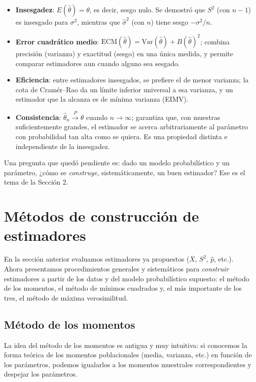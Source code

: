 \documentclass[11pt,a4paper]{article}
\theoremstyle{plain}
\theoremstyle{definition}
\theoremstyle{remark}
\begin{document}
\begin{itemize}[leftmargin=1.3cm]
\item \textbf{Insesgadez}: $E(\widehat\theta)=\theta$, es decir, sesgo nulo. Se demostró que $S^2$ (con $n-1$) es insesgado para $\sigma^2$, mientras que $\widehat\sigma^2$ (con $n$) tiene sesgo $-\sigma^2/n$.
\item \textbf{Error cuadrático medio}: $\mathrm{ECM}(\widehat\theta)=\mathrm{Var}(\widehat\theta)+B(\widehat\theta)^2$; combina precisión (varianza) y exactitud (sesgo) en una única medida, y permite comparar estimadores aun cuando alguno sea sesgado.
\item \textbf{Eficiencia}: entre estimadores insesgados, se prefiere el de menor varianza; la cota de Cramér--Rao da un límite inferior universal a esa varianza, y un estimador que la alcanza es de mínima varianza (EIMV).
\item \textbf{Consistencia}: $\widehat\theta_n\xrightarrow{P}\theta$ cuando $n\to\infty$; garantiza que, con muestras suficientemente grandes, el estimador se acerca arbitrariamente al parámetro con probabilidad tan alta como se quiera. Es una propiedad distinta e independiente de la insesgadez.
\end{itemize}

Una pregunta que quedó pendiente es: dado un modelo probabilístico y un parámetro, ¿cómo se \emph{construye}, sistemáticamente, un buen estimador? Ese es el tema de la Sección 2.

\newpage
\section{Métodos de construcción de estimadores}

En la sección anterior evaluamos estimadores ya propuestos ($\overline X$, $S^2$, $\widehat p$, etc.). Ahora presentamos procedimientos generales y sistemáticos para \emph{construir} estimadores a partir de los datos y del modelo probabilístico supuesto: el método de los momentos, el método de mínimos cuadrados y, el más importante de los tres, el método de máxima verosimilitud.

\subsection{Método de los momentos}

La idea del método de los momentos es antigua y muy intuitiva: si conocemos la forma teórica de los momentos poblacionales (media, varianza, etc.) en función de los parámetros, podemos igualarlos a los momentos muestrales correspondientes y despejar los parámetros.
\end{document}
